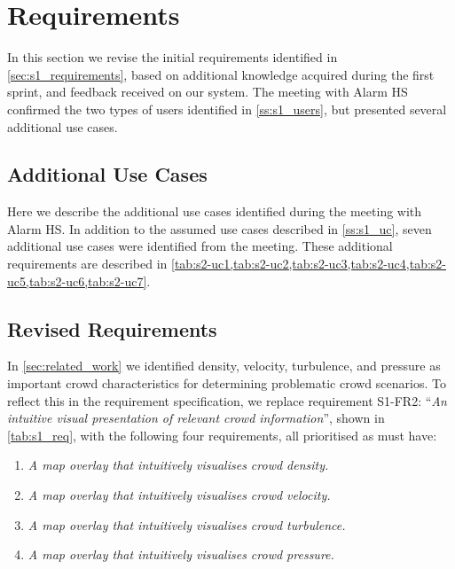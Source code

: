 \section{Requirements} \label{sec:s2_reqs}
In this section we revise the initial requirements identified in \cref{sec:s1_requirements}, based on additional knowledge acquired during the first sprint, and feedback received on our system. The meeting with Alarm HS confirmed the two types of users identified in \cref{ss:s1_users}, but presented several additional use cases.

\subsection{Additional Use Cases} \label{ss:s2_uc}
Here we describe the additional use cases identified during the meeting with Alarm HS. In addition to the assumed use cases described in \cref{ss:s1_uc}, seven additional use cases were identified from the meeting. These additional requirements are described in \cref{tab:s2-uc1,tab:s2-uc2,tab:s2-uc3,tab:s2-uc4,tab:s2-uc5,tab:s2-uc6,tab:s2-uc7}.





\subsection{Revised Requirements} \label{ss:s2_update_reqs}
In \cref{sec:related_work} we identified density, velocity, turbulence, and pressure as important crowd characteristics for determining problematic crowd scenarios. To reflect this in the requirement specification, we replace requirement S1-FR2: \enquote{\emph{An intuitive visual presentation of relevant crowd information}}, shown in \cref{tab:s1_req}, with the following four requirements, all prioritised as must have:

\begin{enumerate}
    \item \emph{A map overlay that intuitively visualises crowd density.} 
    \item \emph{A map overlay that intuitively visualises crowd velocity.}
    \item \emph{A map overlay that intuitively visualises crowd turbulence.}
    \item \emph{A map overlay that intuitively visualises crowd pressure.}
\end{enumerate}

